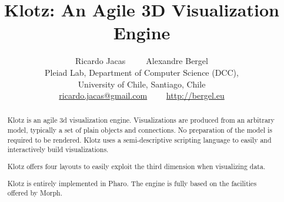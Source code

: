 \documentclass{sig-alternate}
\newcommand{\Title}{Klotz: An Agile 3D Visualization Engine}
\newcommand{\Authors}{Ricardo Jacas~~~~~Alexandre Bergel}
\newcommand{\AuthorsShort}{R. Jacas, A. Bergel}
\begin{document}


\title{\Title}

\author{\Authors\\
Pleiad Lab, Department of Computer Science (DCC),\\ University of Chile, Santiago, Chile\\ [1 ex]
\url{ricardo.jacas@gmail.com}~~~~
\url{http://bergel.eu}
}




\newcommand{\spp}{~~~~~~~}

\maketitle


\begin{abstract}
Klotz is an agile 3d visualization engine. Visualizations are produced from an arbitrary model, typically a set of plain objects and connections. No preparation of the model is required to be rendered.
Klotz uses a semi-descriptive scripting language to easily and interactively build visualizations. 

Klotz offers four layouts to easily exploit the third dimension when visualizing data. %

Klotz is entirely implemented in Pharo. The engine is fully based on the facilities offered by Morph. 
\end{abstract}
\end{document}
